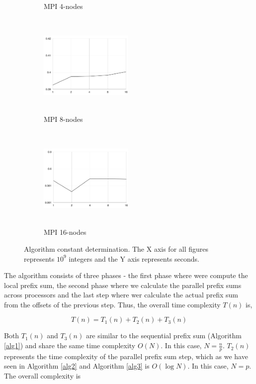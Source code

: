 \documentclass[11pt]{article}
\begin{document}
\begin{figure}[ht]
\begin{subfigure}[h!]{0.3\textwidth}
        \caption{MPI 4-nodes}
        \label{fig:M4}
    \end{subfigure}
    \hfill
    \begin{subfigure}[h!]{0.3\textwidth}
        \centering
        \includegraphics[width=4.5cm,height=5cm,keepaspectratio]{m_8}
        \caption{MPI 8-nodes}
        \label{fig:M8}
    \end{subfigure}
    \hfill
    \begin{subfigure}[h!]{0.3\textwidth}
        \centering
        \includegraphics[width=4.5cm,height=5cm,keepaspectratio]{m_16}
        \caption{MPI 16-nodes}
        \label{fig:M16}
    \end{subfigure}
    \hfill
    \label{Constants}
    \caption{Algorithm constant determination. The X axis for all figures represents $10^{9}$ integers and the Y axis represents seconds.}
\end{figure}

The algorithm consists of three phases - the first phase where were compute the local prefix sum, the second phase where we calculate the parallel prefix sums across processors and the last step where wer calculate the actual prefix sum from the offsets of the previous step. Thus, the overall time complexity $T(n)$ is,

\[T(n) = T_{1}(n) + T_{2}(n) + T_{3}(n)\]

Both $T_{1}(n)$ and $T_{3}(n)$ are similar to the sequential prefix sum (Algorithm \ref{alg1}) and share the same time complexity $O(N)$. In this case, $N = \frac{n}{p}$. $T_{2}(n)$ represents the time complexity of the parallel prefix sum step, which as we have seen in Algorithm \ref{alg2} and Algorithm \ref{alg3} is $O(\log N)$. In this case, $N = p$. The overall complexity is
\end{document}
